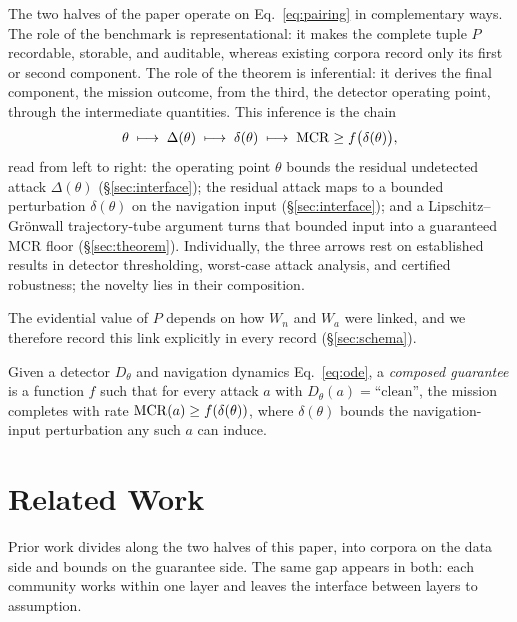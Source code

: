 The two halves of the paper operate on Eq.~\eqref{eq:pairing} in complementary
ways. The role of the benchmark is representational: it makes the complete
tuple $P$ recordable, storable, and auditable, whereas existing corpora record
only its first or second component. The role of the theorem is inferential: it
derives the final component, the mission outcome, from the third, the detector
operating point, through the intermediate quantities. This inference is the
chain
\begin{equation}
\label{eq:chain}
\theta \;\longmapsto\; \Delta(\theta) \;\longmapsto\; \delta(\theta)
\;\longmapsto\; \mathrm{MCR} \ge f\big(\delta(\theta)\big),
\end{equation}
read from left to right: the operating point $\theta$ bounds the residual
undetected attack $\Delta(\theta)$ (\S\ref{sec:interface}); the residual attack
maps to a bounded perturbation $\delta(\theta)$ on the navigation input
(\S\ref{sec:interface}); and a Lipschitz--Gr\"onwall trajectory-tube argument
turns that bounded input into a guaranteed MCR floor (\S\ref{sec:theorem}).
Individually, the three arrows rest on established results in detector
thresholding, worst-case attack analysis, and certified robustness; the novelty
lies in their composition.

The evidential value of $P$ depends on how $W_n$ and $W_a$ were linked, and we
therefore record this link explicitly in every record (\S\ref{sec:schema}).

\begin{definition}
\label{def:composed}
Given a detector $D_\theta$ and navigation dynamics Eq.~\eqref{eq:ode}, a
\emph{composed guarantee} is a function $f$ such that for every attack $a$ with
$D_\theta(a)=\text{``clean''}$, the mission completes with rate
$\mathrm{MCR}(a)\ge f(\delta(\theta))$, where $\delta(\theta)$ bounds the
navigation-input perturbation any such $a$ can induce.
\end{definition}

\section{Related Work}
\label{sec:related}
Prior work divides along the two halves of this paper, into corpora on the data
side and bounds on the guarantee side. The same gap appears in both: each
community works within one layer and leaves the interface between layers to
assumption.

